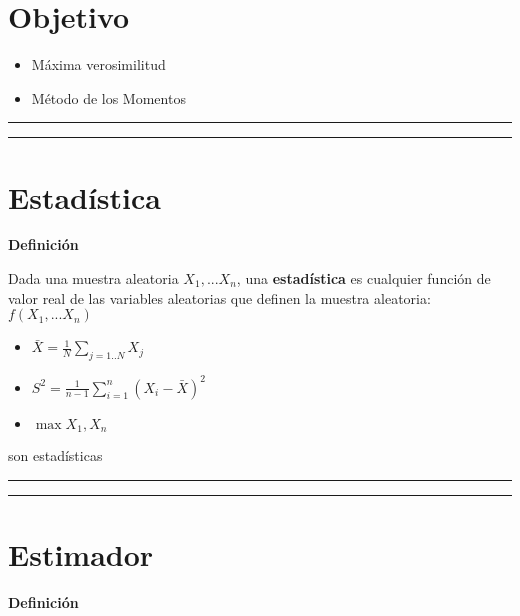 \documentclass[
]{book}
\providecommand{\tightlist}{%
  \setlength{\itemsep}{0pt}\setlength{\parskip}{0pt}}
\begin{document}
\hypertarget{objetivo-11}{%
\section{Objetivo}\label{objetivo-11}}

\begin{itemize}
\tightlist
\item
  Máxima verosimilitud
\item
  Método de los Momentos
\end{itemize}

\begin{center}\rule{0.5\linewidth}{0.5pt}\end{center}

\begin{center}\rule{0.5\linewidth}{0.5pt}\end{center}

\hypertarget{estaduxedstica}{%
\section{Estadística}\label{estaduxedstica}}

\textbf{Definición}

Dada una muestra aleatoria \(X_1,...X_n\), una \textbf{estadística} es cualquier función de valor real de las variables aleatorias que definen la muestra aleatoria: \(f(X_1,...X_n)\)

\begin{itemize}
\tightlist
\item
  \(\bar{X}=\frac{1}{N} \sum_{j=1..N} X_j\)
\item
  \(S^2=\frac{1}{n-1}\sum_{i=1}^n (X_i-\bar{X})^2\)
\item
  \(\max{X_1, X_n}\)
\end{itemize}

son estadísticas

\begin{center}\rule{0.5\linewidth}{0.5pt}\end{center}

\begin{center}\rule{0.5\linewidth}{0.5pt}\end{center}

\hypertarget{estimador}{%
\section{Estimador}\label{estimador}}

\textbf{Definición}
\end{document}
